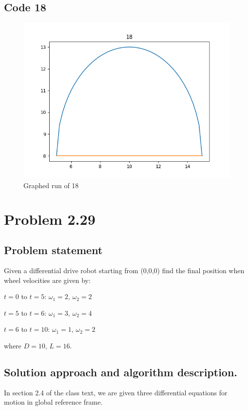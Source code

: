 \documentclass[letterpaper,11pt]{texMemo} %
\begin{document}
\subsection*{Code 18}
\begin{tiny}

\end{tiny}

\begin{figure}[hb]
\caption{Graphed run of 18}
\centering
\includegraphics[scale=0.5]{img/18.png}
\end{figure}

\newpage
\section*{Problem 2.29}
\subsection*{Problem statement}
Given a differential drive robot starting from (0,0,0) find the final position when wheel
velocities are given by:

$t=0$ to $t=5$: $\omega_1=2$, $\omega_2=2$

$t=5$ to $t=6$: $\omega_1=3$, $\omega_2=4$

$t=6$ to $t=10$: $\omega_1=1$, $\omega_2=2$

where $D=10$, $L=16$.

\subsection*{Solution approach and algorithm description.}
In section 2.4 of the class text, we are given three differential equations
for motion in global reference frame.
\end{document}

